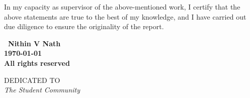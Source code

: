 \documentclass[oneside,12pt]{IIScthesisPSnPDF}
\newcommand{\blankpage}{
\newpage
\thispagestyle{empty}
\mbox{}
\newpage
}
\begin{document}
\noindent In my capacity as supervisor of the above-mentioned work, I certify
that the above statements are true to the best of my knowledge, and 
I have carried out due diligence to ensure the originality of the
report.

\vspace{20mm}

 \qquad



\blankpage

\vspace*{\fill}
\begin{center}
\large\bf \textcopyright \ Nithin V Nath\\
\large\bf \monthyeardate\today\\
\large\bf All rights reserved
\end{center}
\vspace*{\fill}
\thispagestyle{empty}

\blankpage

\vspace*{\fill}
\begin{center}
DEDICATED TO \\[2em]
\Large\it The Student Community\\[2em]
\end{center}
\vspace*{\fill}
\thispagestyle{empty}

%

\end{document}
